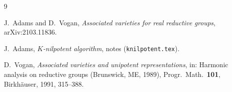 \documentclass[11pt,leqno]{article}
\theoremstyle{definition}
\numberwithin{equation}{section}
\newcommand{\at}[1]{\texttt{#1}}
\begin{document}
\begin{thebibliography}{9}

J.~Adams and D.~Vogan, \emph{Associated varieties for real reductive
groups}, arXiv:2103.11836.

J.~Adams, \emph{$K$-nilpotent algorithm}, notes (\at{knilpotent.tex}).

D.~Vogan, \emph{Associated varieties and unipotent representations}, in:
Harmonic analysis on reductive groups (Brunswick, ME, 1989), Progr.\ Math.\
\textbf{101}, Birkh\"auser, 1991, 315--388.

\end{thebibliography}
\end{document}
